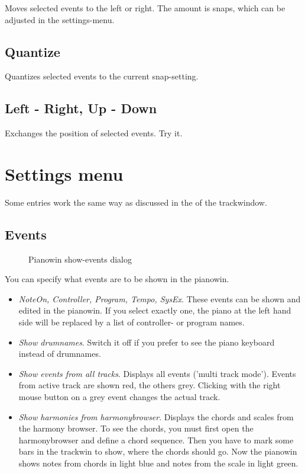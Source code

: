 \documentclass[letterpaper]{report}
\begin{document}
Moves selected events to the left or right. The amount is snaps, which can be
adjusted in the settings-menu.

\subsection{Quantize}
Quantizes selected events to the current snap-setting.

\subsection{Left - Right, Up - Down}

Exchanges the position of selected events. Try it.

\section{Settings menu}

Some entries work the same way as discussed in the
 of the trackwindow.

\subsection{Events}\label{pwevents}

\begin{figure}%
%
%
\caption{Pianowin show-events dialog}%
\end{figure}

You can specify what events are to be shown in the pianowin.

\begin{itemize}
\item {\em NoteOn, Controller, Program, Tempo, SysEx}. These events can be
shown and
edited in the pianowin. If you select exactly one, the piano at the left
hand side will be replaced by a list of controller- or program names.
\item {\em Show drumnames}. Switch it off if you prefer to see the piano
keyboard instead of drumnames.
\item {\em Show events from all tracks}. Displays all events
('multi track mode'). Events from active track are shown
red, the others grey. Clicking with the right mouse button on a grey event
changes the actual track.
\item {\em Show harmonies from harmonybrowser}. Displays the chords and
scales from the harmony browser. To see the chords, you must first open the
harmonybrowser and define a chord sequence. Then you have to mark some bars
in the trackwin to show, where the chords should go. Now the pianowin shows
notes from chords in light blue and notes from the scale in light green.

\end{itemize}
\end{document}
